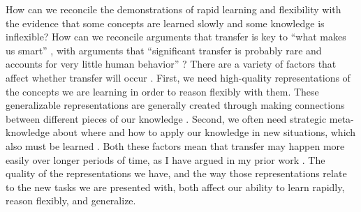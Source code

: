 How can we reconcile the demonstrations of rapid learning and flexibility with the evidence that some concepts are learned slowly and some knowledge is inflexible? How can we reconcile arguments that transfer is key to ``what makes us smart'' \citep{Gentner2003}, with arguments that ``significant transfer is probably rare and accounts for very little human behavior'' \citep{Detterman1993}? There are a variety of factors that affect whether transfer will occur \citep{Barnett2002, Lampinen2017a}. First, we need high-quality representations of the concepts we are learning in order to reason flexibly with them. These generalizable representations are generally created through making connections between different pieces of our knowledge \citep{Wilensky1991, Schwartz2015}. Second, we often need strategic meta-knowledge about where and how to apply our knowledge in new situations, which also must be learned \citep{Weber2001}. Both these factors mean that transfer may happen more easily over longer periods of time, as I have argued in my prior work \citep{Lampinen2017a}. The quality of the representations we have, and the way those representations relate to the new tasks we are presented with, both affect our ability to learn rapidly, reason flexibly, and generalize. \par 

